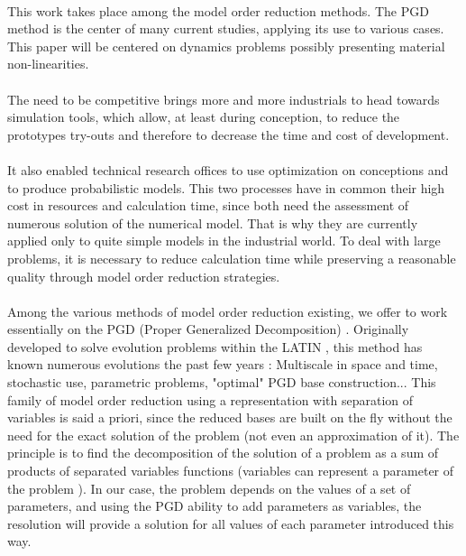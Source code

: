 
\paragraph*{}
This work takes place among the model order reduction methods. The PGD method is the center of many current studies, applying its use to various cases. This paper will be centered on dynamics problems possibly presenting material non-linearities.
\paragraph*{}
The need to be competitive brings more and more industrials to head towards simulation tools, which allow, at least during conception, to reduce the prototypes try-outs and therefore to decrease the time and cost of development.
\paragraph*{}
It also enabled technical research offices to use optimization on conceptions and to produce probabilistic models. This two processes have in common their high cost in resources and calculation time, since both need the assessment of numerous solution of the numerical model. That is why they are currently applied only to quite simple models in the industrial world. To deal with large problems, it is necessary to reduce calculation time while preserving a reasonable quality through model order reduction strategies.
\paragraph*{}
Among the various methods of model order reduction existing, we offer to work essentially on the PGD (Proper Generalized Decomposition) \cite{Creation,ShortReview}. Originally developed to solve evolution problems within the LATIN \cite{Creation}, this method has known numerous evolutions the past few years \cite{ElasticVisco,Parametrized} : Multiscale in space and time, stochastic use, parametric problems, "optimal" PGD base construction... This family of model order reduction using a representation with separation of variables is said a priori, since the reduced bases are built on the fly without the need for the exact solution of the problem (not even an approximation of it). The principle is to find the decomposition of the solution of a problem as a sum of products of separated variables functions (variables can represent a parameter of the problem \cite{Multidimensional}). In our case, the problem depends on the values of a set of parameters, and using the PGD ability to add parameters as variables, the resolution will provide a solution for all values of each parameter introduced this way.
